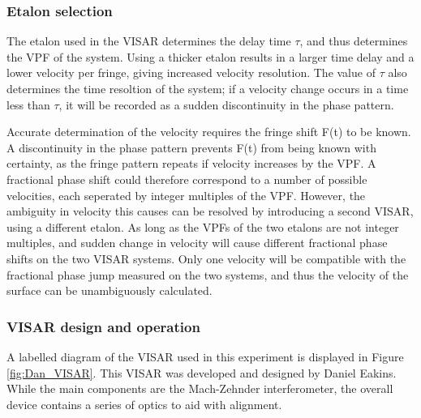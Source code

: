 \subsubsection{Etalon selection}

The etalon used in the VISAR determines the delay time $\tau$, and thus determines the VPF of the system. Using a thicker etalon results in a larger time delay and a lower velocity per fringe, giving increased velocity resolution. The value of $\tau$ also determines the time resoltion of the system; if a velocity change occurs in a time less than $\tau$, it will be recorded as a sudden discontinuity in the phase pattern.

Accurate determination of the velocity requires the fringe shift F(t) to be known. A discontinuity in the phase pattern prevents F(t) from being known with certainty, as the fringe pattern repeats if velocity increases by the VPF. A fractional phase shift could therefore correspond to a number of possible velocities, each seperated by integer multiples of the VPF. However, the ambiguity in velocity this causes can be resolved by introducing a second VISAR, using a different etalon. As long as the VPFs of the two etalons are not integer multiples, and sudden change in velocity will cause different fractional phase shifts on the two VISAR systems. Only one velocity will be compatible with the fractional phase jump measured on the two systems, and thus the velocity of the surface can be unambiguously calculated.

\subsubsection{VISAR design and operation}

A labelled diagram of the VISAR used in this experiment is displayed in Figure \ref{fig:Dan_VISAR}. This VISAR was developed and designed by Daniel Eakins. While the main components are the Mach-Zehnder interferometer, the overall device contains a series of optics to aid with alignment.

